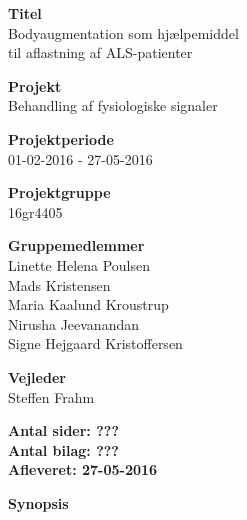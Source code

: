 \begin{minipage}[t]{0.48\textwidth}
\textbf{Titel} \\[5pt]\hspace*{2ex} 
Bodyaugmentation som hjælpemiddel \\\bigskip\hspace*{2ex}
til aflastning af ALS-patienter%
 

\textbf{Projekt} \\[5pt]\bigskip\hspace*{2ex}
Behandling af fysiologiske signaler%

\textbf{Projektperiode} \\[5pt]\bigskip\hspace{2ex}
01-02-2016 - 27-05-2016

\textbf{Projektgruppe} \\[5pt]\bigskip\hspace{2ex}
16gr4405

\textbf{Gruppemedlemmer} \\[5pt]\hspace*{2ex}
Linette Helena Poulsen \\\hspace*{2ex}
Mads Kristensen \\\hspace*{2ex}
Maria Kaalund Kroustrup \\\hspace*{2ex}
Nirusha Jeevanandan \\\bigskip\hspace*{2ex}
Signe Hejgaard Kristoffersen %


\textbf{Vejleder} \\[5pt]\bigskip\hspace*{2ex}
Steffen Frahm %


\vspace*{1cm}

\textbf{Antal sider: ???} \\
\textbf{Antal bilag: ???} \\ 
\textbf{Afleveret: 27-05-2016}

\end{minipage}
\hfill
\begin{minipage}[t]{0.483\textwidth}
\textbf{Synopsis} \\[5pt]
\fbox{\parbox{8cm}{\bigskip\bigskip}}
\end{minipage}

